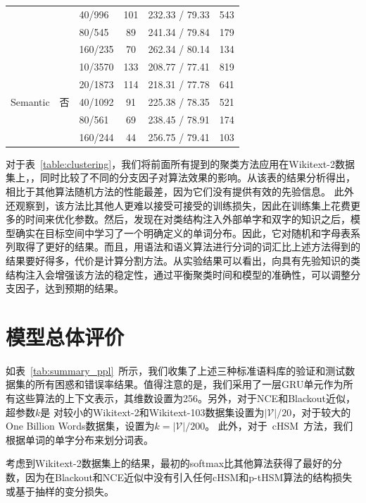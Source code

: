 \begin{table}[!ht]
\begin{tabular}{lclccc}
    &&40/996 &101&232.33 / 79.33&543\\
    &&80/545 &89&241.34 / 79.84&179\\
    &&160/235 &70&262.34 / 80.14&134\\
  \midrule
  \multirow{5}{*}{Semantic}  &\multirow{5}{*}{否} &10/3570 &133&208.77 / 77.41&819\\
    & &20/1873 &114&218.31 / 77.78&641\\
    & &40/1092 &91&225.38 / 78.35&521\\
    & &80/561 &69&238.45 / 78.91&174\\
    & &160/244 &44&256.75 / 79.41&103\\
\bottomrule
  \end{tabular}
\end{table}

对于表~\ref{table:clustering}，我们将前面所有提到的聚类方法应用在Wikitext-2数据集上，，同时比较了不同的分支因子对算法效果的影响。从该表的结果分析得出，相比于其他算法随机方法的性能最差，因为它们没有提供有效的先验信息。
此外还观察到，该方法比其他人更难以接受可接受的训练损失，因此在训练集上花费更多的时间来优化参数。然后，发现在对类结构注入外部单字和双字的知识之后，模型确实在目标空间中学习了一个明确定义的单词分布。因此，它对随机和字母表系列取得了更好的结果。而且，用语法和语义算法进行分词的词汇比上述方法得到的结果要好得多，代价是计算分割方法。从实验结果可以看出，向具有先验知识的类结构注入会增强该方法的稳定性，通过平衡聚类时间和模型的准确性，可以调整分支因子，达到预期的结果。



\section{模型总体评价}
如表~\ref{tab:summary_ppl}~所示，我们收集了上述三种标准语料库的验证和测试数据集的所有困惑和错误率结果。值得注意的是，我们采用了一层GRU单元作为所有这些算法的上下文表示，其维数设置为256。另外，对于NCE和Blackout近似，超参数$ k $是 对较小的Wikitext-2和Wikitext-103数据集设置为$\mathcal{|V|}/20 $，对于较大的One Billion Words数据集，设置为$ k=|\mathcal{V}|/200 $。 此外，对于~cHSM~方法，我们根据单词的单字分布来划分词表。

考虑到Wikitext-2数据集上的结果，最初的softmax比其他算法获得了最好的分数，因为在Blackout和NCE近似中没有引入任何cHSM和p-tHSM算法的结构损失或基于抽样的变分损失。

